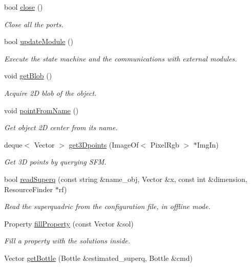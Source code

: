 \begin{DoxyCompactItemize}
bool \hyperlink{classGraspDemo_a22d5fb62d4c13fce0b27dfce65d3272a}{close} ()
\begin{DoxyCompactList}\small\item\em Close all the ports. \end{DoxyCompactList}\item 
bool \hyperlink{classGraspDemo_a97b8a4cbbc94f444651a1746bd3a8164}{update\+Module} ()
\begin{DoxyCompactList}\small\item\em Execute the state machine and the communications with external modules. \end{DoxyCompactList}\item 
void \hyperlink{classGraspDemo_a85434849e19708c5270b41f8b68ccc81}{get\+Blob} ()\label{classGraspDemo_a85434849e19708c5270b41f8b68ccc81}

\begin{DoxyCompactList}\small\item\em Acquire 2D blob of the object. \end{DoxyCompactList}\item 
void \hyperlink{classGraspDemo_ab34b34da55d93d16b344ac37faaec8cd}{point\+From\+Name} ()\label{classGraspDemo_ab34b34da55d93d16b344ac37faaec8cd}

\begin{DoxyCompactList}\small\item\em Get object 2D center from its name. \end{DoxyCompactList}\item 
deque$<$ Vector $>$ \hyperlink{classGraspDemo_a14780589e408a271496b3b44ac3df874}{get3\+Dpoints} (Image\+Of$<$ Pixel\+Rgb $>$ $\ast$Img\+In)
\begin{DoxyCompactList}\small\item\em Get 3D points by querying S\+FM. \end{DoxyCompactList}\item 
bool \hyperlink{classGraspDemo_a31f6cab85a8d544a65fb270226a9839c}{read\+Superq} (const string \&name\+\_\+obj, Vector \&x, const int \&dimension, Resource\+Finder $\ast$rf)
\begin{DoxyCompactList}\small\item\em Read the superquadric from the configuration file, in offline mode. \end{DoxyCompactList}\item 
Property \hyperlink{classGraspDemo_a4ff3132df68c4ef30b8e58b6f29f5bf9}{fill\+Property} (const Vector \&sol)
\begin{DoxyCompactList}\small\item\em Fill a property with the solutions inside. \end{DoxyCompactList}\item 
Vector \hyperlink{classGraspDemo_af6e521f663f44999c66cbe91aeedb23b}{get\+Bottle} (Bottle \&estimated\+\_\+superq, Bottle \&cmd)\label{classGraspDemo_af6e521f663f44999c66cbe91aeedb23b}


\end{DoxyCompactItemize}
